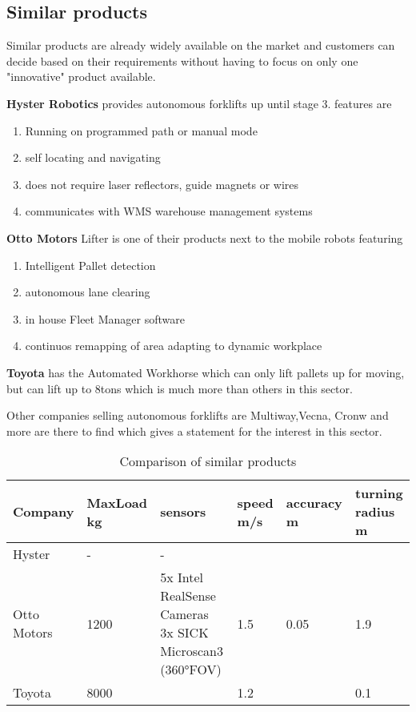 \documentclass[../report.tex]{subfiles}
\begin{document}
\subsection{Similar products}
Similar products are already widely available on the market and customers can decide based on their requirements
without having to focus on only one "innovative" product available.

\textbf{Hyster Robotics} provides autonomous forklifts up until stage 3.
features are 
\begin{enumerate}
    \item Running on programmed path or manual mode
    \item self locating and navigating
    \item does not require laser reflectors, guide magnets or wires
    \item communicates with WMS warehouse management systems 
\end{enumerate}

\textbf{Otto Motors} Lifter is one of their products next to the mobile robots featuring
\begin{enumerate}
    \item Intelligent Pallet detection
    \item autonomous lane clearing
    \item in house Fleet Manager software
    \item continuos remapping of area adapting to dynamic workplace
\end{enumerate}

\textbf{Toyota} has the Automated Workhorse which can only lift pallets up for moving, but 
can lift up to 8tons which is much more than others in this sector.

Other companies selling autonomous forklifts are Multiway,Vecna, Cronw and more are there to find 
which gives a statement for the interest in this sector. 
\begin{table}[H]
    \begin{tabularx}{\linewidth}{| L || L | L | L | L | L | } 
        \hline
        Company& MaxLoad kg & sensors & speed m/s & accuracy m & turning radius m \\ 
        \hline
        \hline
        Hyster & - & - & & & \\ 
        \hline
        Otto Motors & 1200 & 5x Intel RealSense Cameras 3x SICK Microscan3 (360°FOV)& 1.5 & 0.05 & 1.9\\ 
        \hline
        Toyota & 8000 & & 1.2 & &0.1\\
        \hline
      \end{tabularx}
      \caption{Comparison of similar products}
\end{table}
\end{document}
